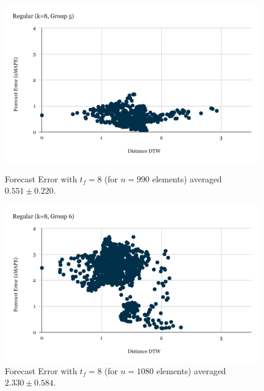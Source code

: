 \begin{figure}[!htbp]
  \centering
  \begin{minipage}[b]{0.45\textwidth}
    \includegraphics[width=\textwidth]{../Figures/distDTW_ForecastError_r8_c5}
    \caption{Forecast Error with $t_{f}=8$ (for $n=990$ elements) averaged $0.551 \pm 0.220$.}
    \label{Fig:DTWsMAPE_r8_g5}
  \end{minipage}
  \hfill
  \begin{minipage}[b]{0.45\textwidth}
    \includegraphics[width=\textwidth]{../Figures/distDTW_ForecastError_r8_c6}
    \caption{Forecast Error with $t_{f}=8$ (for $n=1080$ elements) averaged $2.330 \pm 0.584$.}
    \label{Fig:DTWsMAPE_r8_g64}
  \end{minipage}
\end{figure}

